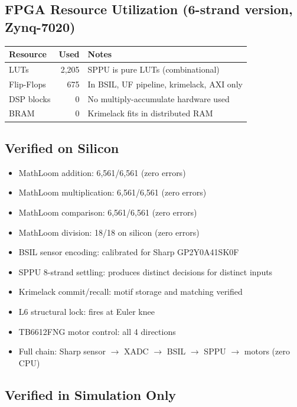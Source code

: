\documentclass[11pt,a4paper]{article}
\begin{document}
\subsection{FPGA Resource Utilization (6-strand version, Zynq-7020)}

\begin{center}
\begin{tabular}{lrl}
\toprule
\textbf{Resource} & \textbf{Used} & \textbf{Notes} \\
\midrule
LUTs & 2,205 & SPPU is pure LUTs (combinational) \\
Flip-Flops & 675 & In BSIL, UF pipeline, krimelack, AXI only \\
DSP blocks & 0 & No multiply-accumulate hardware used \\
BRAM & 0 & Krimelack fits in distributed RAM \\
\bottomrule
\end{tabular}
\end{center}

\subsection{Verified on Silicon}

\begin{itemize}
    \item MathLoom addition: 6,561/6,561 (zero errors)
    \item MathLoom multiplication: 6,561/6,561 (zero errors)
    \item MathLoom comparison: 6,561/6,561 (zero errors)
    \item MathLoom division: 18/18 on silicon (zero errors)
    \item BSIL sensor encoding: calibrated for Sharp GP2Y0A41SK0F
    \item SPPU 8-strand settling: produces distinct decisions for distinct inputs
    \item Krimelack commit/recall: motif storage and matching verified
    \item L6 structural lock: fires at Euler knee
    \item TB6612FNG motor control: all 4 directions
    \item Full chain: Sharp sensor $\rightarrow$ XADC $\rightarrow$ BSIL $\rightarrow$ SPPU $\rightarrow$ motors (zero CPU)
\end{itemize}

\subsection{Verified in Simulation Only}
\end{document}
